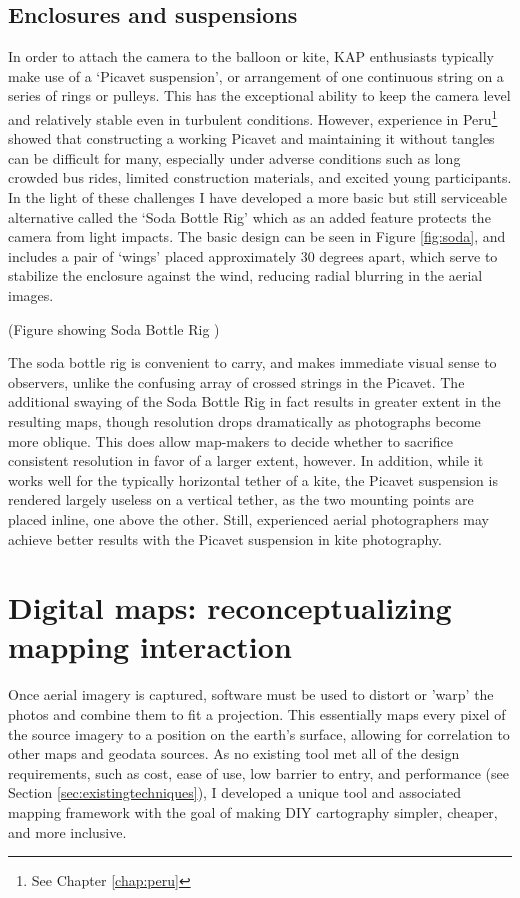 \documentclass[11pt]{report}
\begin{document}
\subsection{Enclosures and suspensions}
\label{subsec:cameraenclosures}

In order to attach the camera to the balloon or kite, \ac{KAP} enthusiasts typically make use of a `Picavet suspension', or arrangement of one continuous string on a series of rings or pulleys. This has the exceptional ability to keep the camera level and relatively stable even in turbulent conditions. However, experience in Peru\footnote{See Chapter \ref{chap:peru}} showed that constructing a working Picavet and maintaining it without tangles can be difficult for many, especially under adverse conditions such as long crowded bus rides, limited construction materials, and excited young participants. In the light of these challenges I have developed a more basic but still serviceable alternative called the `Soda Bottle Rig' which as an added feature protects the camera from light impacts. The basic design can be seen in Figure \ref{fig:soda}, and includes a pair of `wings' placed approximately 30 degrees apart, which serve to stabilize the enclosure against the wind, reducing radial blurring in the aerial images.

(Figure showing Soda Bottle Rig \label{fig:soda})

The soda bottle rig is convenient to carry, and makes immediate visual sense to observers, unlike the confusing array of crossed strings in the Picavet. The additional swaying of the Soda Bottle Rig in fact results in greater extent in the resulting maps, though resolution drops dramatically as photographs become more oblique. This does allow map-makers to decide whether to sacrifice consistent resolution in favor of a larger extent, however. In addition, while it works well for the typically horizontal tether of a kite, the Picavet suspension is rendered largely useless on a vertical tether, as the two mounting points are placed inline, one above the other. Still, experienced aerial photographers may achieve better results with the Picavet suspension in kite photography.  

\section{Digital maps: reconceptualizing mapping interaction}

Once aerial imagery is captured, software must be used to distort or 'warp' the photos and combine them to fit a projection. This essentially maps every pixel of the source imagery to a position on the earth's surface, allowing for correlation to other maps and geodata sources. As no existing tool met all of the design requirements, such as cost, ease of use, low barrier to entry, and performance (see Section \ref{sec:existingtechniques}), I developed a unique tool and associated mapping framework with the goal of making DIY cartography simpler, cheaper, and more inclusive.
\end{document}
